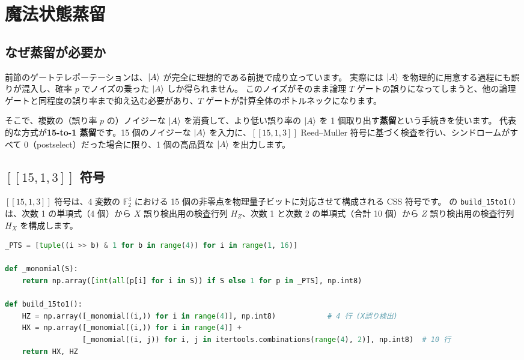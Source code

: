 \section{魔法状態蒸留}\label{sec:distill}

\subsection{なぜ蒸留が必要か}

前節のゲートテレポーテーションは、$\ket{A}$ が完全に理想的である前提で成り立っています。
実際には $\ket{A}$ を物理的に用意する過程にも誤りが混入し、確率 $p$ でノイズの乗った $\ket{A}$ しか得られません。
このノイズがそのまま論理 $T$ ゲートの誤りになってしまうと、他の論理ゲートと同程度の誤り率まで抑え込む必要があり、$T$ ゲートが計算全体のボトルネックになります。

そこで、複数の（誤り率 $p$ の）ノイジーな $\ket{A}$ を消費して、より低い誤り率の $\ket{A}$ を 1 個取り出す\textbf{蒸留}という手続きを使います。
代表的な方式が\textbf{15-to-1 蒸留}です。15 個のノイジーな $\ket{A}$ を入力に、$[[15,1,3]]$ Reed--Muller 符号に基づく検査を行い、シンドロームがすべて $0$（postselect）だった場合に限り、1 個の高品質な $\ket{A}$ を出力します\cite{bravyi2005magic}。

\subsection{$[[15,1,3]]$ 符号}

$[[15,1,3]]$ 符号は、4 変数の $\mathbb{F}_2^4$ における 15 個の非零点を物理量子ビットに対応させて構成される CSS 符号です。
 の \texttt{build\_15to1()} は、次数 1 の単項式（4 個）から $X$ 誤り検出用の検査行列 $H_Z$、次数 1 と次数 2 の単項式（合計 10 個）から $Z$ 誤り検出用の検査行列 $H_X$ を構成します。

\begin{lstlisting}[language=Python, caption={[[15,1,3]] 符号の構成（src/stages/01\_mpp/src/ftqc/t\_gate.py）}]
_PTS = [tuple((i >> b) & 1 for b in range(4)) for i in range(1, 16)]

def _monomial(S):
    return np.array([int(all(p[i] for i in S)) if S else 1 for p in _PTS], np.int8)

def build_15to1():
    HZ = np.array([_monomial((i,)) for i in range(4)], np.int8)            # 4 行 (X誤り検出)
    HX = np.array([_monomial((i,)) for i in range(4)] +
                  [_monomial((i, j)) for i, j in itertools.combinations(range(4), 2)], np.int8)  # 10 行
    return HX, HZ
\end{lstlisting}

